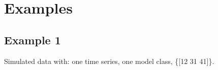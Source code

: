 \documentclass{article}
\begin{document}
%
%
%
%
%
%


\section{Examples}
\subsection{Example 1}
Simulated data with: one time series, one model class, \{[12 31 41]\}.
\end{document}
